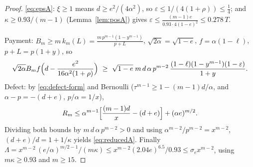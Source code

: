 \documentclass[11pt]{article}
\newcommand{\eps}{\varepsilon}
\begin{document}
\begin{proof}
\eqref{eq:epsA}: $\xi\ge1$ means $d\ge e^2/(4\alpha^2)$, so
$\eps\le1/(4(1+\rho))\le\tfrac14$; and $\kappa\ge0.93/(m-1)$
(Lemma~\ref{lem:posA}) gives
$\eps\le\frac{(m-1)e}{0.93\cdot4(1-e)^2}\le0.278\,T$.

Payment: $B_m\ge m\,k_m(L)=\frac{m\,p^{m-1}(1-y^{m-1})}{p+L}$, $\sqrt{2\alpha}=\sqrt{1-e}$,
$f=\alpha(1-\ell)$, $p+L=p(1+y)$, so
\[
        \sqrt{2\alpha}B_mf\Bigl(d-\frac{e^2}{16\alpha^2(1+\rho)}\Bigr)
        \ \ge\
        \sqrt{1-e}\;m\,d\,\alpha\,p^{m-2}\,
        \frac{(1-\ell)(1-y^{m-1})(1-\eps)}{1+y}.
\]
Defect: by \eqref{eq:defect-form} and Bernoulli
($\tau^{m-1}\ge1-(m-1)d/\alpha$, and $\alpha-p=-(d+e)$, $p/\alpha=1/x$),
\[
        R_m\le\alpha^{m-1}\Bigl[\frac{(m-1)d}{x}-(d+e)\Bigr]+(\alpha e)^{m/2}.
\]
Dividing both bounds by $m\,d\,\alpha\,p^{m-2}>0$ and using
$\alpha^{m-2}/p^{m-2}=x^{m-2}$, $(d+e)/d=1+1/\kappa$ yields
\eqref{eq:reducedA}.  Finally
$\Lambda=x^{m-2}\,(e/\alpha)^{m/2-1}/(m\kappa)
\le x^{m-2}(2.04e)^{6.5}/0.93\le\sigma_e x^{m-2}$,
using $m\kappa\ge0.93$ and $m\ge15$.
\end{proof}
\end{document}
